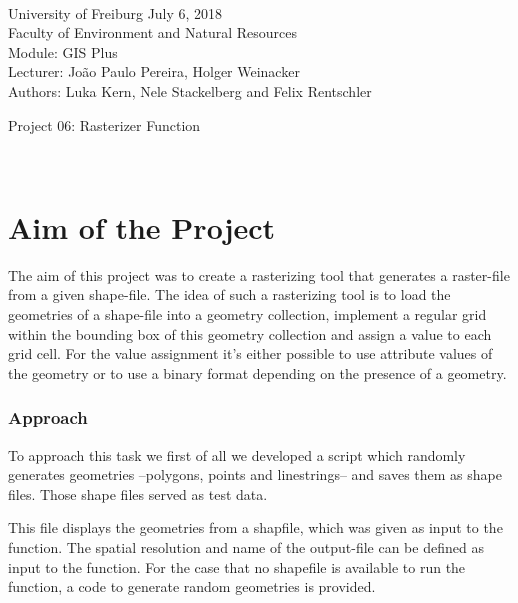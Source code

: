 \documentclass[10pt, a4paper]{article}
\begin{document}
\markboth{}
\\\noindent University of Freiburg \hspace{10cm}  July 6, 2018
\\Faculty of Environment and Natural Resources
\\Module: GIS Plus
\\Lecturer: João Paulo Pereira, Holger Weinacker
\\Authors: Luka Kern, Nele Stackelberg and Felix Rentschler
\\

\begin{center}
	\huge{Project 06: Rasterizer Function} \vspace{0.5cm}\\
\end{center}

\
\onehalfspacing %



\begin{abstract}
	
\end{abstract}


\section{Aim of the Project}
The aim of this project was to create a rasterizing tool that generates a raster-file from a given shape-file. The idea of such a rasterizing tool is to load the geometries of a shape-file into a geometry collection, implement a regular grid within the bounding box of this geometry collection and assign a value to each grid cell. For the value assignment it's either possible to use attribute values of the geometry or to use a binary format depending on the presence of a geometry.

\subsubsection*{Approach}
To approach this task we first of all we developed a script which randomly generates geometries --polygons, points and linestrings-- and saves them as shape files. Those shape files served as test data. 


This file displays the geometries from a shapfile, which was given as input to the function. The spatial resolution and name of the output-file can be defined as input to the function.
For the case that no shapefile is available to run the function, a code to generate random geometries is provided.
\end{document}
